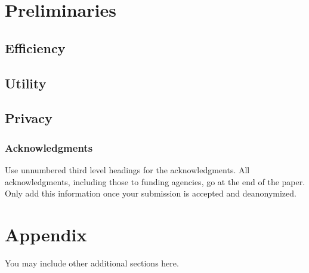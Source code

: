 \documentclass[10pt]{article} %
\begin{document}
\section{Preliminaries}
\label{sec:preliminaries}

\subsection{Efficiency}

\subsection{Utility}

\subsection{Privacy}


\subsubsection*{Acknowledgments}
Use unnumbered third level headings for the acknowledgments. All
acknowledgments, including those to funding agencies, go at the end of the paper.
Only add this information once your submission is accepted and deanonymized. 




\appendix
\section{Appendix}
You may include other additional sections here.
\end{document}
